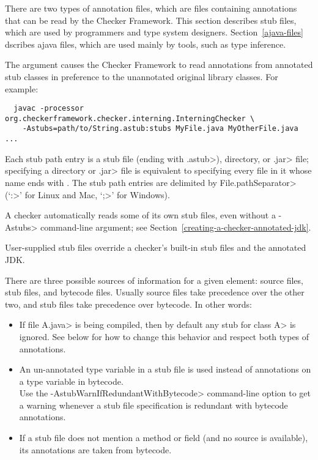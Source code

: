 There are two types of annotation files, which are files containing annotations that
can be read by the Checker Framework.
This section describes stub files, which are used by programmers and
type system designers.
Section~\ref{ajava-files} dscribes ajava files, which are used mainly by
tools, such as type inference.



The  argument causes the Checker Framework to read
annotations from annotated stub classes in preference to the unannotated
original library classes.  For example:

\begin{myxsmall}
\begin{Verbatim}
  javac -processor org.checkerframework.checker.interning.InterningChecker \
    -Astubs=path/to/String.astub:stubs MyFile.java MyOtherFile.java ...
\end{Verbatim}
\end{myxsmall}

Each stub path entry is a stub file (ending with \<.astub>), directory, or
\<.jar> file; specifying a directory or \<.jar> file is
equivalent to specifying every file in it whose name ends with
.  The stub path entries are delimited by
\<File.pathSeparator> (`\<:>' for Linux and Mac, `\<;>' for Windows).

A checker automatically reads some of its own stub files, even without a
\<-Astubs> command-line argument; see
Section~\ref{creating-a-checker-annotated-jdk}.

User-supplied stub files override a checker's built-in stub files and the
annotated JDK\@.



There are three possible sources of information for a given
element: source files, stub files, and bytecode files.
Usually source files take precedence over the other two,
and stub files take precedence over bytecode.
In other words:
\begin{itemize}
\item
  If file \<A.java> is being compiled, then by default any stub for class
  \<A> is ignored.  See below for how to change this behavior and respect
  both types of annotations.
\item
  An un-annotated type variable in a stub file is used instead of
  annotations on a type variable in bytecode.
  \\
  Use the \<-AstubWarnIfRedundantWithBytecode> command-line option to get a
  warning whenever a stub file specification is redundant with bytecode
  annotations.
\item
  If a stub file does not mention a method or field (and no source is
  available), its annotations are taken from bytecode.
\end{itemize}

